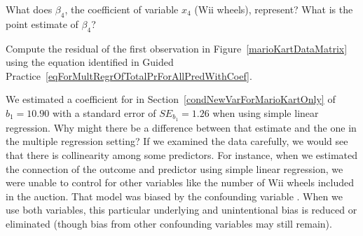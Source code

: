 \begin{exercisewrap}
\begin{nexercise}
What does $\beta_4$, the coefficient of variable
$x_4$ (Wii wheels), represent?
What is the point estimate of $\beta_4$?\footnotemark{}
\end{nexercise}
\end{exercisewrap}

\begin{exercisewrap}
\begin{nexercise}
\label{computeMultipleRegressionResidualForMarioKart}%
Compute the residual of the first observation in
Figure~\vref{marioKartDataMatrix} using the equation identified
in Guided Practice~\ref{eqForMultRegrOfTotalPrForAllPredWithCoef}.\footnotemark{}
\end{nexercise}
\end{exercisewrap}

\begin{examplewrap}
\begin{nexample}{We estimated a coefficient for
     in
    Section~\ref{condNewVarForMarioKartOnly}
    of $b_1 = 10.90$ with a standard error of $SE_{b_1} = 1.26$
    when using simple linear regression.
    Why might there be a difference between that estimate
    and the one in the multiple regression setting?}
  \label{colinearityOfCondNewAndStockPhoto}%
  If we examined the data carefully, we would see that
  there is collinearity among some predictors.
  For instance, when we estimated the connection of the outcome
   and predictor  using simple linear
  regression, we were unable to control for other variables like
  the number of Wii wheels included in the auction.
  That model was biased by the confounding variable .
  When we use both variables, this particular underlying and
  unintentional bias is reduced or eliminated (though bias
  from other confounding variables may still remain).
\end{nexample}
\end{examplewrap}




